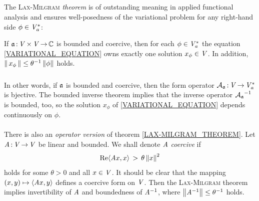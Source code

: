\documentclass[11pt,twoside]{article}
\begin{document}
\subparagraph*{} %
The \textsc{Lax-Milgram} \textit{theorem} is of outstanding meaning
in applied functional analysis
and ensures well-posedness of the variational problem
for any right-hand side $\phi \in \mathit{V}_a^*$:

\begin{theorem}\label{LAX-MILGRAM_THEOREM}
If $\mathfrak{a}{\,:\,}\mathit{V} {\,\times\,} \mathit{V} {\,\to\,} {\mathbb{C}}$ is bounded and coercive,
then for each $\phi \in \mathit{V}_a^*$
the equation \eqref{VARIATIONAL_EQUATION} owns exactly
one solution $x_{\phi} \in \mathit{V}$.
In addition,
$\left\lVert \,x_{\phi}\, \right\rVert \leq \theta^{-1} \left\lVert \phi \right\rVert$ holds.
\end{theorem}

\subparagraph*{}
In other words,
if $\mathfrak{a}$ is bounded and coercive,
then the form operator ${{\mathcal{A}}_{\mathfrak{a}}}{\,:\,} \mathit{V} {\,\to\,} \mathit{V}_a^*$ is bjective.
The bounded inverse theorem implies
that the inverse operator ${{\mathcal{A}}_{\mathfrak{a}}}^{-1}$ is bounded,
too,
so the solution $x_{\phi}$ of \eqref{VARIATIONAL_EQUATION}
depends continuously on $\phi$.

\paragraph*{} %
There is also an \textit{operator version} of theorem \ref{LAX-MILGRAM_THEOREM}.
Let $\mathit{A}{\,:\,}\mathit{V} {\,\to\,} \mathit{V}$ be linear and bounded.
We shall denote $\mathit{A}$ \textit{coercive} if
\[
\operatorname{Re} \langle \mathit{A} x,x \rangle \, > \, \theta \left\lVert x \right\rVert^2
\]
holds for some $\theta > 0$ and all $x \in \mathit{V}$.
It should be clear
that the mapping $(x,y) \mapsto \langle \mathit{A} x,y \rangle$
defines a coercive form on $\mathit{V}$.
Then the \textsc{Lax-Milgram} theorem implies
invertibility of $\mathit{A}$ and boundedness of $\mathit{A}^{-1}$,
where $\left\lVert \mathit{A}^{-1} \right\rVert \leq \theta^{-1}$ holds.
\end{document}

